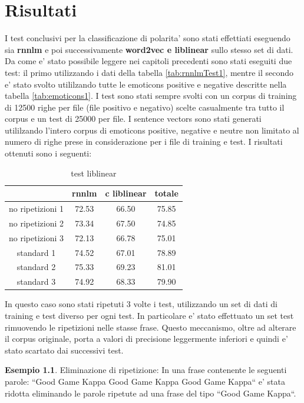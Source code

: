 \documentclass[a4paper,11pt]{book}
\theoremstyle{definition}
\newtheorem{es}{Esempio}[section]
\begin{document}
\chapter{Risultati}
I test conclusivi per la classificazione di polarita' sono stati effettiati eseguendo sia \textbf{rnnlm} e poi successivamente \textbf{word2vec e liblinear} sullo stesso set di dati. Da come e' stato possibile leggere nei capitoli precedenti sono stati eseguiti due test: il primo utilizzando i dati della tabella  \ref{tab:rnnlmTest1}, mentre il secondo e' stato svolto utililzando tutte le emoticons positive e negative descritte nella tabella \ref{tab:emoticons1}. 
I test sono stati sempre svolti con un corpus di training di 12500 righe per file (file positivo e negativo) scelte casualmente tra tutto il corpus e un test di 25000 per file. I sentence vectors sono stati generati utililzando l'intero corpus di emoticons positive, negative e neutre non limitato al numero di righe prese in considerazione per i file di training e test.
I risultati ottenuti sono i seguenti:
\begin{table}[h]
\begin{center}
\begin{tabular}{|c|c|c|c|}
\hline
& rnnlm & c liblinear & totale \\
\hline
no ripetizioni 1 & 72.53 & 66.50 & 75.85  \\
\hline
no ripetizioni 2 & 73.34 & 67.50 & 74.85  \\
\hline
no ripetizioni 3 & 72.13 & 66.78 & 75.01  \\
\hline
standard 1 & 74.52 & 67.01 & 78.89 \\
\hline
standard 2 & 75.33 & 69.23 & 81.01 \\
\hline
standard 3 & 74.92 & 68.33 & 79.90 \\
\hline
\end{tabular}
\end{center}
\caption{test liblinear}
\label{tab:test1}
\end{table}

In questo caso sono stati ripetuti 3 volte i test, utilizzando un set di dati di training e test diverso per ogni test. In particolare e' stato effettuato un set test rimuovendo le ripetizioni nelle stasse frase. Questo meccanismo, oltre ad alterare il corpus originale, porta a valori di precisione leggermente inferiori e quindi e' stato scartato dai successivi test.
\begin{es}
Eliminazione di ripetizione: In una frase contenente le seguenti parole:  ``Good Game Kappa Good Game Kappa Good Game Kappa`` e' stata ridotta eliminando le parole ripetute ad una frase del tipo ``Good Game Kappa``.
\end{es}
\end{document}
